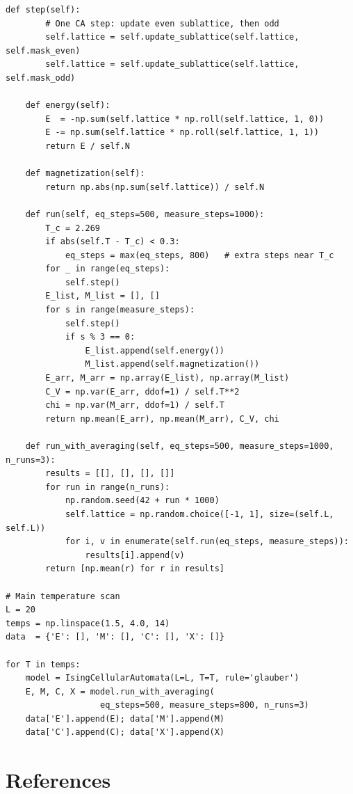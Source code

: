 \documentclass[11pt,a4paper]{article}
\begin{document}
\begin{lstlisting}[caption={Core class and main simulation loop from \texttt{01\_ising\_cellular\_automata.py}.}]
    def step(self):
        # One CA step: update even sublattice, then odd
        self.lattice = self.update_sublattice(self.lattice, self.mask_even)
        self.lattice = self.update_sublattice(self.lattice, self.mask_odd)

    def energy(self):
        E  = -np.sum(self.lattice * np.roll(self.lattice, 1, 0))
        E -= np.sum(self.lattice * np.roll(self.lattice, 1, 1))
        return E / self.N

    def magnetization(self):
        return np.abs(np.sum(self.lattice)) / self.N

    def run(self, eq_steps=500, measure_steps=1000):
        T_c = 2.269
        if abs(self.T - T_c) < 0.3:
            eq_steps = max(eq_steps, 800)   # extra steps near T_c
        for _ in range(eq_steps):
            self.step()
        E_list, M_list = [], []
        for s in range(measure_steps):
            self.step()
            if s % 3 == 0:
                E_list.append(self.energy())
                M_list.append(self.magnetization())
        E_arr, M_arr = np.array(E_list), np.array(M_list)
        C_V = np.var(E_arr, ddof=1) / self.T**2
        chi = np.var(M_arr, ddof=1) / self.T
        return np.mean(E_arr), np.mean(M_arr), C_V, chi

    def run_with_averaging(self, eq_steps=500, measure_steps=1000, n_runs=3):
        results = [[], [], [], []]
        for run in range(n_runs):
            np.random.seed(42 + run * 1000)
            self.lattice = np.random.choice([-1, 1], size=(self.L, self.L))
            for i, v in enumerate(self.run(eq_steps, measure_steps)):
                results[i].append(v)
        return [np.mean(r) for r in results]

# Main temperature scan
L = 20
temps = np.linspace(1.5, 4.0, 14)
data  = {'E': [], 'M': [], 'C': [], 'X': []}

for T in temps:
    model = IsingCellularAutomata(L=L, T=T, rule='glauber')
    E, M, C, X = model.run_with_averaging(
                   eq_steps=500, measure_steps=800, n_runs=3)
    data['E'].append(E); data['M'].append(M)
    data['C'].append(C); data['X'].append(X)
\end{lstlisting}

\section*{References}
\end{document}
